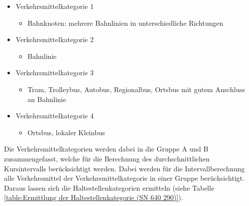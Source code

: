 \begin{itemize}[noitemsep]
    \item Verkehrsmittelkategorie 1
    \begin{itemize}
        \item Bahnknoten: mehrere Bahnlinien in unterschiedliche Richtungen
    \end{itemize}
    \item Verkehrsmittelkategorie 2
    \begin{itemize}
        \item Bahnlinie
    \end{itemize}
    \item Verkehrsmittelkategorie 3
    \begin{itemize}
        \item Tram, Trolleybus, Autobus, Regionalbus, Ortsbus mit gutem Anschluss an Bahnlinie
    \end{itemize}
    \item Verkehrsmittelkategorie 4
    \begin{itemize}
        \item Ortsbus, lokaler Kleinbus
    \end{itemize}
\end{itemize}

Die Verkehrsmittelkategorien werden dabei in die Gruppe A und B zusammengefasst, welche für die Berechnung des durchschnittlichen Kursintervalls berücksichtigt werden.
Dabei werden für die Intervallberechnung alle Verkehrsmittel der Verkehrsmittelkategorie in einer Gruppe berücksichtigt.
Daraus lassen sich die Haltestellenkategorien ermitteln (siehe Tabelle \ref{table:Ermittlung der Haltestellenkategorie (SN 640 290)}).


